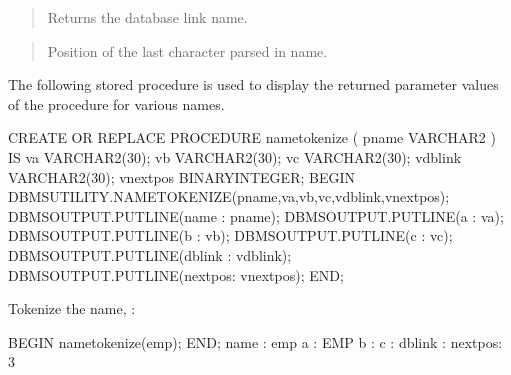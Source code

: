 \documentclass[letterpaper,10pt,english,openany,oneside]{sphinxmanual}
\begin{document}
\begin{quote}

Returns the database link name.
\end{quote}

\begin{quote}

Position of the last character parsed in name.
\end{quote}


The following stored procedure is used to display the returned parameter
values of the  procedure for various names.

%
\begin{sphinxVerbatim}[commandchars=\\\{\}]
CREATE OR REPLACE PROCEDURE name\PYGZus{}tokenize (
    p\PYGZus{}name          VARCHAR2
)
IS
    v\PYGZus{}a             VARCHAR2(30);
    v\PYGZus{}b             VARCHAR2(30);
    v\PYGZus{}c             VARCHAR2(30);
    v\PYGZus{}dblink        VARCHAR2(30);
    v\PYGZus{}nextpos       BINARY\PYGZus{}INTEGER;
BEGIN
    DBMS\PYGZus{}UTILITY.NAME\PYGZus{}TOKENIZE(p\PYGZus{}name,v\PYGZus{}a,v\PYGZus{}b,v\PYGZus{}c,v\PYGZus{}dblink,v\PYGZus{}nextpos);
    DBMS\PYGZus{}OUTPUT.PUT\PYGZus{}LINE(\PYGZsq{}name   : \PYGZsq{} \textbar{}\textbar{} p\PYGZus{}name);
    DBMS\PYGZus{}OUTPUT.PUT\PYGZus{}LINE(\PYGZsq{}a      : \PYGZsq{} \textbar{}\textbar{} v\PYGZus{}a);
    DBMS\PYGZus{}OUTPUT.PUT\PYGZus{}LINE(\PYGZsq{}b      : \PYGZsq{} \textbar{}\textbar{} v\PYGZus{}b);
    DBMS\PYGZus{}OUTPUT.PUT\PYGZus{}LINE(\PYGZsq{}c      : \PYGZsq{} \textbar{}\textbar{} v\PYGZus{}c);
    DBMS\PYGZus{}OUTPUT.PUT\PYGZus{}LINE(\PYGZsq{}dblink : \PYGZsq{} \textbar{}\textbar{} v\PYGZus{}dblink);
    DBMS\PYGZus{}OUTPUT.PUT\PYGZus{}LINE(\PYGZsq{}nextpos: \PYGZsq{} \textbar{}\textbar{} v\PYGZus{}nextpos);
END;
\end{sphinxVerbatim}

\newpage

Tokenize the name, :

%
\begin{sphinxVerbatim}[commandchars=\\\{\}]
BEGIN
name\PYGZus{}tokenize(\PYGZsq{}emp\PYGZsq{});
END;
name
: emp
a
: EMP
b
:
c
:
dblink :
nextpos: 3
\end{sphinxVerbatim}
\end{document}
